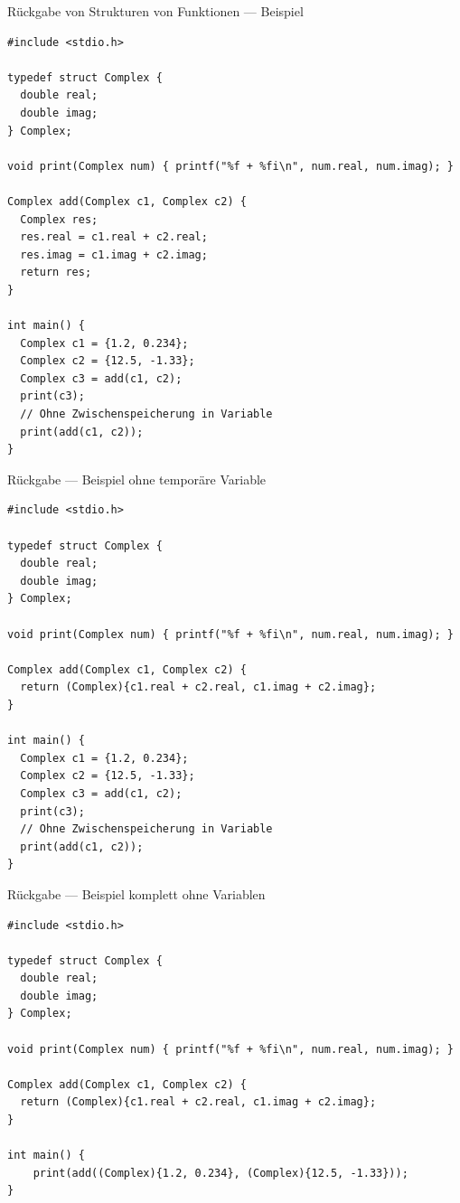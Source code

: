 \documentclass[presentation]{beamer}
\begin{document}
\begin{frame}[label={sec:orgeffb613},fragile]{Rückgabe von Strukturen von Funktionen --- Beispiel}
 \begin{verbatim}
#include <stdio.h>

typedef struct Complex {
  double real;
  double imag;
} Complex;

void print(Complex num) { printf("%f + %fi\n", num.real, num.imag); }

Complex add(Complex c1, Complex c2) {
  Complex res;
  res.real = c1.real + c2.real;
  res.imag = c1.imag + c2.imag;
  return res;
}

int main() {
  Complex c1 = {1.2, 0.234};
  Complex c2 = {12.5, -1.33};
  Complex c3 = add(c1, c2);
  print(c3);
  // Ohne Zwischenspeicherung in Variable
  print(add(c1, c2));
}
\end{verbatim}
\end{frame}
\begin{frame}[label={sec:org962b235},fragile]{Rückgabe --- Beispiel ohne temporäre Variable}
 \begin{verbatim}
#include <stdio.h>

typedef struct Complex {
  double real;
  double imag;
} Complex;

void print(Complex num) { printf("%f + %fi\n", num.real, num.imag); }

Complex add(Complex c1, Complex c2) {
  return (Complex){c1.real + c2.real, c1.imag + c2.imag};
}

int main() {
  Complex c1 = {1.2, 0.234};
  Complex c2 = {12.5, -1.33};
  Complex c3 = add(c1, c2);
  print(c3);
  // Ohne Zwischenspeicherung in Variable
  print(add(c1, c2));
}
\end{verbatim}
\end{frame}
\begin{frame}[label={sec:orgf519c29},fragile]{Rückgabe --- Beispiel komplett ohne Variablen}
 \begin{verbatim}
#include <stdio.h>

typedef struct Complex {
  double real;
  double imag;
} Complex;

void print(Complex num) { printf("%f + %fi\n", num.real, num.imag); }

Complex add(Complex c1, Complex c2) {
  return (Complex){c1.real + c2.real, c1.imag + c2.imag};
}

int main() {
    print(add((Complex){1.2, 0.234}, (Complex){12.5, -1.33}));
}
\end{verbatim}
\end{frame}
\end{document}
